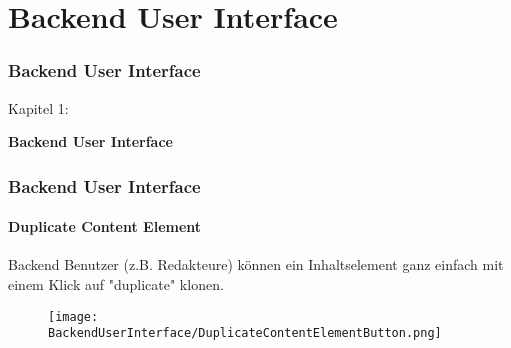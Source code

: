 %

\section{Backend User Interface}
\begin{frame}[fragile]
	\frametitle{Backend User Interface}

	\begin{center}\huge{Kapitel 1:}\end{center}
	\begin{center}\huge{\color{typo3darkgrey}\textbf{Backend User Interface}}\end{center}

\end{frame}


\begin{frame}[fragile]
	\frametitle{Backend User Interface}
	\framesubtitle{Duplicate Content Element}

	Backend Benutzer (z.B. Redakteure) können ein Inhaltselement ganz einfach mit einem Klick auf "duplicate" klonen.

	\begin{figure}
		\texttt{[image: BackendUserInterface/DuplicateContentElementButton.png]}
	\end{figure}

\end{frame}


